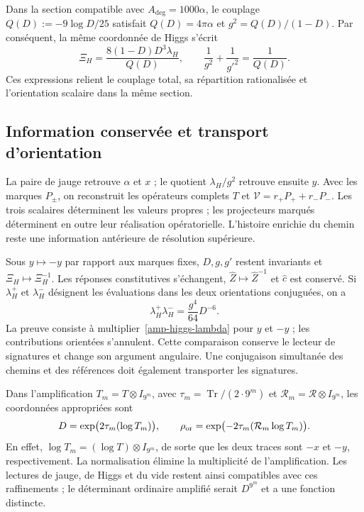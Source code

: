 Dans la section compatible avec $A_{\deg}=1000\alpha$, le couplage
$Q(D):=-9\log D/25$ satisfait $Q(D)=4\pi\alpha$ et
$g^2=Q(D)/(1-D)$. Par conséquent, la même coordonnée de Higgs s’écrit
\begin{equation}
 \Xi_H=\frac{8(1-D)D^3\lambda_H}{Q(D)},\qquad
 \frac1{g^2}+\frac1{g'^2}=\frac1{Q(D)}.
 \label{amp-higgs-curva}
\end{equation}
Ces expressions relient le couplage total, sa répartition rationalisée
et l’orientation scalaire dans la même section.

\subsection{Information conservée et transport d’orientation}

La paire de jauge retrouve $\alpha$ et $x$ ; le quotient
$\lambda_H/g^2$ retrouve ensuite $y$. Avec les marques $P_\pm$, on reconstruit
les opérateurs complets $T$ et $\mathcal V=r_+P_++r_-P_-$.
Les trois scalaires déterminent les valeurs propres ; les projecteurs marqués
déterminent en outre leur réalisation opératorielle. L’histoire enrichie du
chemin reste une information antérieure de résolution supérieure.

Sous $y\mapsto-y$ par rapport aux marques fixes, $D,g,g'$ restent
invariants et $\Xi_H\mapsto\Xi_H^{-1}$. Les réponses constitutives s’échangent,
$\widehat Z\mapsto\widehat Z^{-1}$ et $\widehat c$ est conservé.
Si $\lambda_H^+$ et $\lambda_H^-$ désignent les évaluations dans les deux
orientations conjuguées, on a
\begin{equation}
 \lambda_H^+\lambda_H^-
 =\frac{g^4}{64}D^{-6}.
 \label{amp-higgs-orientacion}
\end{equation}
La preuve consiste à multiplier~\eqref{amp-higgs-lambda} pour $y$ et $-y$ ;
les contributions orientées s’annulent. Cette comparaison conserve le
lecteur de signatures et change son argument angulaire. Une conjugaison simultanée
des chemins et des références doit également transporter les signatures.

Dans l’amplification $T_m=T\otimes I_{9^m}$, avec
$\tau_m=\operatorname{Tr}/(2\cdot9^m)$ et
$\mathcal R_m=\mathcal R\otimes I_{9^m}$, les coordonnées appropriées sont
\begin{equation}
 D=\exp\bigl(2\tau_m(\log T_m)\bigr),\qquad
 \rho_{\rm or}=\exp\bigl(-2\tau_m(\mathcal R_m\log T_m)\bigr).
 \label{amp-higgs-refinamiento}
\end{equation}
En effet, $\log T_m=(\log T)\otimes I_{9^m}$, de sorte que les deux traces
sont $-x$ et $-y$, respectivement. La normalisation élimine la multiplicité
de l’amplification. Les lectures de jauge, de Higgs et du vide restent ainsi
compatibles avec ces raffinements ; le déterminant ordinaire amplifié
serait $D^{9^m}$ et a une fonction distincte.

